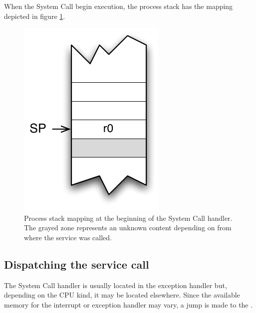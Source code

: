When the System Call begin execution, the process stack has the mapping depicted in figure \ref{fig:stackbeginningSC}.

\begin{figure}[htbp] %
\begin{minipage}{0.5\textwidth}
    \centering
  \includegraphics[scale=.6]{pictures/PStackAfterInvoque} 
\end{minipage}
\begin{minipage}{0.5\textwidth}
   \caption{Process stack mapping at the beginning of the System Call handler. The grayed zone represents an unknown content depending on from where the service was called.}\label{fig:stackbeginningSC}
\end{minipage}
\end{figure}

\subsection{Dispatching the service call}

The System Call handler is usually located in the  exception handler but, depending on the CPU kind, it may be located elsewhere. Since the available memory for the interrupt or exception handler may vary, a jump is made to the .%

%


